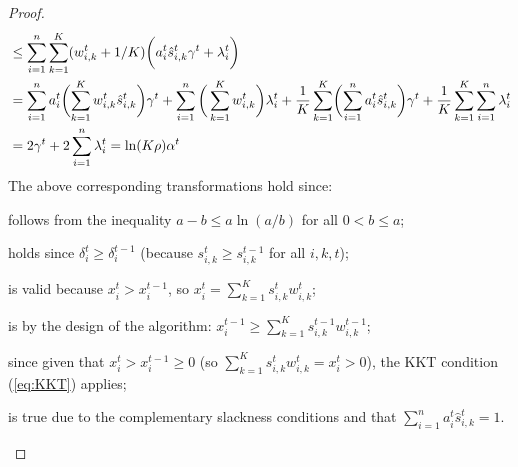 \begin{proof}
\begin{align}
%
%
&\leq \sum_{i=1}^{n} \sum_{k=1}^{K} (w_{i,k}^{t} + 1/K) \biggl( a_{i}^{t} \hat{s}_{i,k}^{t} \gamma^t + \lambda_{i}^{t} \biggr) \notag \\
%
&= \sum_{i=1}^{n} a_{i}^{t} \biggl(\sum_{k=1}^{K} w_{i,k}^{t} \hat{s}_{i,k}^{t} \biggr) \gamma^t + \sum_{i=1}^{n} \bigg( \sum_{k=1}^{K} w_{i,k}^{t} \biggr) \lambda_{i}^{t}
+ \frac{1}{K}  \sum_{k=1}^{K} \biggl( \sum_{i=1}^{n} a_{i}^{t}  \hat{s}_{i,k}^{t}  \biggr) \gamma^t + \frac{1}{K} \sum_{k=1}^{K} \sum_{i=1}^{n} \lambda_{i}^{t} 		\notag \\
%
&= 2 \gamma^{t} + 2\sum_{i=1}^{n} \lambda_{i}^{t} = \ln(K \rho) \alpha^{t}
\end{align}
%
The above corresponding transformations hold since:
\begin{compactenum}[(1)]
	\setcounter{enumi}{1}
	\item follows from the inequality $a - b \leq a \ln(a/b)$ for all $0 < b \leq a$;
	\item holds since $\delta_{i}^{t} \geq \delta_{i}^{t-1}$ (because $s_{i,k}^{t} \geq s_{i,k}^{t-1}$ for all $i,k,t$);
	\item is valid because $x_{i}^{t} > x_{i}^{t-1}$, so $x_{i}^{t} = \sum_{k=1}^{K}  s_{i,k}^{t} w_{i,k}^{t}$;
	\item is by the design of the algorithm: $x_{i}^{t-1} \geq \sum_{k=1}^{K}  s_{i,k}^{t-1} w_{i,k}^{t-1}$;
	\setcounter{enumi}{5}
	\item since given that $x_{i}^{t} > x_{i}^{t-1} \geq 0$
	(so $\sum_{k=1}^{K}  s_{i,k}^{t} w_{i,k}^{t} = x_{i}^{t} > 0$), the KKT condition (\ref{eq:KKT}) applies;
	\item is true due to the complementary slackness conditions
		and that $\sum_{i=1}^{n} a_{i}^{t}  \hat{s}_{i,k}^{t} = 1$.
\end{compactenum}
\end{proof}

